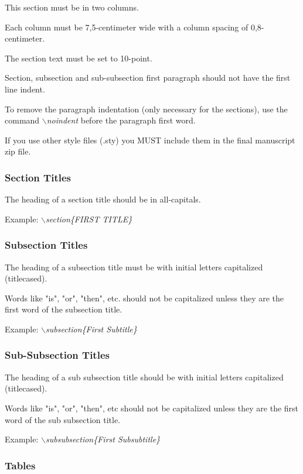\documentclass[a4paper,twoside]{article}
\begin{document}
This section must be in two columns.

Each column must be 7,5-centimeter wide with a column spacing
of 0,8-centimeter.

The section text must be set to 10-point.

Section, subsection and sub-subsection first paragraph should not
have the first line indent.

To remove the paragraph indentation (only necessary for the
sections), use the command \textit{$\backslash$noindent} before the
paragraph first word.

If you use other style files (.sty) you MUST include them in the
final manuscript zip file.

\subsubsection{Section Titles}

\noindent The heading of a section title should be in all-capitals.

Example: \textit{$\backslash$section\{FIRST TITLE\}}

\vfill
\subsubsection{Subsection Titles}

\noindent The heading of a subsection title must be with initial letters
capitalized (titlecased).

Words like "is", "or", "then", etc. should not be capitalized unless
they are the first word of the subsection title.

Example: \textit{$\backslash$subsection\{First Subtitle\}}

\subsubsection{Sub-Subsection Titles}

\noindent The heading of a sub subsection title should be with initial letters
capitalized (titlecased).

Words like "is", "or", "then", etc should not be capitalized unless
they are the first word of the sub subsection title.

Example: \textit{$\backslash$subsubsection\{First Subsubtitle\}}

\subsubsection{Tables}
\end{document}
